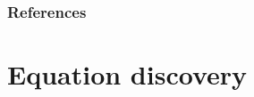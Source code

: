 \documentclass[t,usenames,dvipsnames]{beamer} %
\newcommand{\1}{\boldsymbol{1}}
\newcommand{\0}{\boldsymbol{0}}
\begin{document}
\begin{frame}[allowframebreaks]
        \frametitle{References}
        
        


\end{frame}

% 

\section{Equation discovery}
\end{document}
